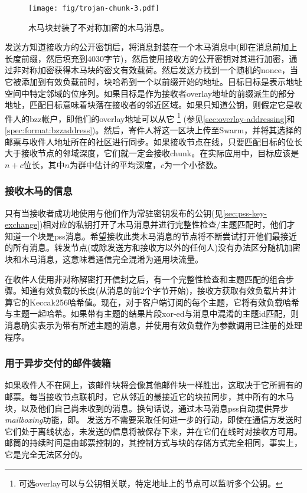 \begin{figure}[htbp]
\centering
\texttt{[image: fig/trojan-chunk-3.pdf]}
\caption[木马chunk\statusgreen]{木马块封装了不对称加密的木马消息。}
\label{fig:trojan-chunk}
\end{figure}

发送方知道接收方的公开密钥后，将消息封装在一个木马消息中(即在消息前加上长度前缀，然后填充到4030字节)，然后使用接收方的公开密钥对其进行加密，通过非对称加密获得木马块的密文有效载荷。然后发送方找到一个随机的nonce，当它被添加到有效负载前时，块哈希到一个以前缀开始的地址。目标目标是表示地址空间中特定邻域的位序列。如果目标是作为接收者overlay地址的前缀派生的部分地址，匹配目标意味着块落在接收者的邻近区域。如果只知道公钥，则假定它是收件人的bzz帐户，即他们的overlay地址可以从它%
%
\footnote{可选overlay可以与公钥相关联，特定地址上的节点可以监听多个公钥。}
%
(参见\ref{sec:overlay-addressing}和\ref{spec:format:bzzaddress})。然后，寄件人将这一区块上传至Swarm，并将其选择的邮票与收件人地址所在的社区进行同步。如果接收节点在线，只要匹配目标的位长大于接收节点的邻域深度，它们就一定会接收chunk。在实际应用中，目标应该是$n+c$位长，其中$n$为群中估计的平均深度，$c$为一个小整数。 

\subsubsection{接收木马的信息}

只有当接收者成功地使用与他们作为常驻密钥发布的公钥(见\ref{sec:pss-key-exchange})相对应的私钥打开了木马消息并进行完整性检查/主题匹配时，他们才知道一个块是pss消息。希望接收此类木马消息的节点将不断尝试打开他们最接近的所有消息。转发节点(或除发送方和接收方以外的任何人)没有办法区分随机加密块和木马消息，这意味着通信完全混淆为通用块流量。

在收件人使用非对称解密打开信封之后，有一个完整性检查和主题匹配的组合步骤。知道有效负载的长度(从消息的前2个字节开始)，接收方获取有效负载片并计算它的Keccak256哈希值。现在，对于客户端订阅的每个主题，它将有效负载哈希与主题一起哈希。如果带有主题的结果片段xor-ed与消息中混淆的主题id匹配，则消息确实表示为带有所述主题的消息，并使用有效负载作为参数调用已注册的处理程序。

\subsubsection{用于异步交付的邮件装箱}

如果收件人不在网上，该邮件块将会像其他邮件块一样胜出，这取决于它所拥有的邮票。每当接收节点联机时，它从邻近的最接近它的块拉同步，其中所有的木马块，以及他们自己尚未收到的消息。换句话说，通过木马消息pss自动提供异步\emph{mailboxing}功能，即。 
发送方不需要采取任何进一步的行动，即使在通信方发送时它们处于离线状态，未发送的信息将被保存下来，并在它们在线时对接收方可用。邮筒的持续时间是由邮票控制的，其控制方式与块的存储方式完全相同，事实上，它是完全无法区分的。

